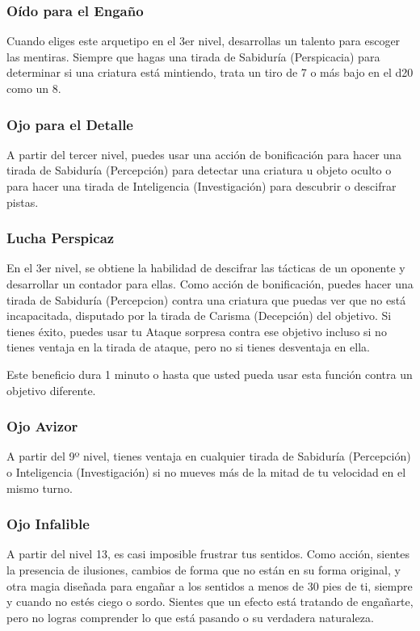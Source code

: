 \documentclass[a4paper,twocolumn,openany,10pt]{dndbook}
\begin{document}
\subsubsection{Oído para el Engaño}
Cuando eliges este arquetipo en el 3er nivel, desarrollas un talento para escoger las mentiras. Siempre que hagas una tirada de
Sabiduría (Perspicacia) para determinar si una criatura está mintiendo, trata un tiro de 7 o más bajo en el d20 como un 8.
 
\subsubsection{Ojo para el Detalle}
A partir del tercer nivel, puedes usar una acción de bonificación para hacer una tirada de Sabiduría (Percepción) para detectar
una criatura u objeto oculto o para hacer una tirada de Inteligencia (Investigación) para descubrir o descifrar pistas. 

\subsubsection{Lucha Perspicaz}
En el 3er nivel, se obtiene la habilidad de descifrar las tácticas de un oponente y desarrollar un contador para ellas. Como
acción de bonificación, puedes hacer una tirada de Sabiduría (Percepcion) contra una criatura que puedas ver que no está
incapacitada, disputado por la tirada de Carisma (Decepción) del objetivo. Si tienes éxito, puedes usar tu Ataque sorpresa
contra ese objetivo incluso si no tienes ventaja en la tirada de ataque, pero no si tienes desventaja en ella.

Este beneficio dura 1 minuto o hasta que usted pueda usar esta función contra un objetivo diferente. 

\subsubsection{Ojo Avizor}
A partir del 9º nivel, tienes ventaja en cualquier tirada de Sabiduría (Percepción) o Inteligencia (Investigación) si no mueves
más de la mitad de tu velocidad en el mismo turno.

\subsubsection{Ojo Infalible}
A partir del nivel 13, es casi imposible frustrar tus sentidos. Como acción, sientes la presencia de ilusiones, cambios de forma
que no están en su forma original, y otra magia diseñada para engañar a los sentidos a menos de 30 pies de ti, siempre y cuando
no estés ciego o sordo. Sientes que un efecto está tratando de engañarte, pero no logras comprender lo que está pasando o su
verdadera naturaleza.
\end{document}
